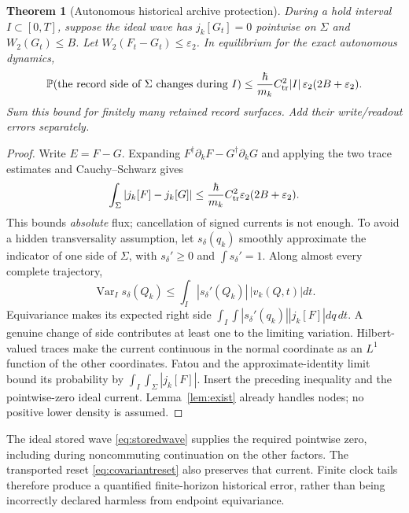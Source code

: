 \documentclass[11pt]{article}
\newtheorem{theorem}{Theorem}[section]
\theoremstyle{definition}\newtheorem{assumption}[theorem]{Constitutive assumption}
\theoremstyle{remark}\newtheorem{remark}[theorem]{Remark}
\newcommand{\Prb}{\mathbb P}\newcommand{\TV}{d_{\rm TV}}
\begin{document}
\begin{theorem}[Autonomous historical archive protection]\label{thm:history}
During a hold interval $I\subset[0,T]$, suppose the ideal wave has $j_k[G_t]=0$ pointwise on $\Sigma$ and $W_2(G_t)\le B$. Let $W_2(F_t-G_t)\le\varepsilon_2$. In equilibrium for the exact autonomous dynamics,
\begin{equation}\label{eq:archiveerror}
 \Prb(\text{the record side of }\Sigma\text{ changes during }I)
 \le\frac{\hbar}{m_k}C_{\rm tr}^2|I|\,
                     \varepsilon_2(2B+\varepsilon_2).
\end{equation}
Sum this bound for finitely many retained record surfaces. Add their write/readout errors separately.
\end{theorem}
\begin{proof}
Write $E=F-G$. Expanding $F^\dagger\partial_kF-G^\dagger\partial_kG$ and applying the two trace estimates and Cauchy--Schwarz gives
\[
 \int_\Sigma|j_k[F]-j_k[G]|\le
 \frac\hbar{m_k}C_{\rm tr}^2\varepsilon_2(2B+\varepsilon_2).
\]
This bounds \emph{absolute} flux; cancellation of signed currents is not enough.
To avoid a hidden transversality assumption, let $s_\delta(q_k)$ smoothly approximate the indicator of one side of $\Sigma$, with $s_\delta'\ge0$ and $\int s_\delta'=1$. Along almost every complete trajectory,
\[
 \operatorname{Var}_{I}s_\delta(Q_k)\le
 \int_I |s_\delta'(Q_k)|\,|v_k(Q,t)|dt.
\]
Equivariance makes its expected right side $\int_I\int |s_\delta'(q_k)||j_k[F]|dq\,dt$. A genuine change of side contributes at least one to the limiting variation. Hilbert-valued traces make the current continuous in the normal coordinate as an $L^1$ function of the other coordinates. Fatou and the approximate-identity limit bound its probability by $\int_I\int_\Sigma|j_k[F]|$. Insert the preceding inequality and the pointwise-zero ideal current. Lemma~\ref{lem:exist} already handles nodes; no positive lower density is assumed.
\end{proof}
The ideal stored wave \eqref{eq:storedwave} supplies the required pointwise zero, including during noncommuting continuation on the other factors. The transported reset \eqref{eq:covariantreset} also preserves that current. Finite clock tails therefore produce a quantified finite-horizon historical error, rather than being incorrectly declared harmless from endpoint equivariance.
\end{document}
